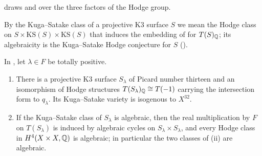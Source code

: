  draws  and  over
the three factors of the Hodge group.

By the Kuga--Satake class of a projective K3 surface $S$ we mean the Hodge
class on $S\times\mathrm{KS}(S)\times\mathrm{KS}(S)$ that induces the embedding
of  for $T(S)_{\mathbb{Q}}$; its algebraicity is the Kuga--Satake
Hodge conjecture for $S$ ().

\begin{theorem}\label{thm:mumfordks}
In , let $\lambda\in F$ be totally positive.
\begin{enumerate}[label=\textup{(\roman*)},nosep,leftmargin=2.6em]
\item There is a projective K3 surface $S_{\lambda}$ of Picard number
  thirteen and an isomorphism of Hodge structures
  $T(S_{\lambda})_{\mathbb{Q}}\cong T(-1)$ carrying the intersection form to
  $q_{\lambda}$. Its Kuga--Satake variety is isogenous to $X^{32}$.
\item If the Kuga--Satake class of $S_{\lambda}$ is algebraic, then the real
  multiplication by $F$ on $T(S_{\lambda})$ is induced by algebraic cycles on
  $S_{\lambda}\times S_{\lambda}$, and every Hodge class in
  $H^{4}(X\times X,\mathbb{Q})$ is algebraic; in particular the two classes of
  (ii) are algebraic.
\end{enumerate}
\end{theorem}

